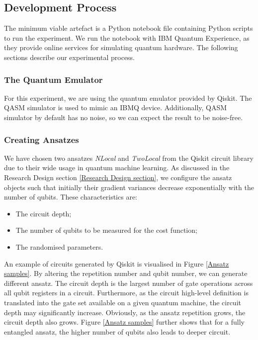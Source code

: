 \subsection{Development Process} \label{Development Process section}
The minimum viable artefact is a Python notebook file containing Python scripts to run the experiment.
We run the notebook with IBM Quantum Experience, as they provide online services for simulating quantum hardware.
The following sections describe our experimental process.

\subsubsection{The Quantum Emulator}
For this experiment, we are using the quantum emulator provided by Qiskit.
The QASM simulator is used to mimic an IBMQ device.
Additionally, QASM simulator by default has no noise, so we can expect the result to be noise-free.

\subsubsection{Creating Ansatzes}
We have chosen two ansatzes \textit{NLocal} and \textit{TwoLocal} from the Qiskit circuit library due to their wide usage in quantum machine learning.
As discussed in the Research Design section \ref{Research Design section}, we configure the ansatz objects such that initially their gradient variances decrease exponentially with the number of qubits.
These characteristics are:
\begin{itemize}
    \item The circuit depth;
    \item The number of qubits to be measured for the cost function;
    \item The randomised parameters.
\end{itemize}

An example of circuits generated by Qiskit is visualised in Figure \ref{Ansatz samples}.
By altering the repetition number and qubit number, we can generate different ansatz.
The circuit depth is the largest number of gate operations across all qubit registers in a circuit. 
Furthermore, as the circuit high-level definition is translated into the gate set available on a given quantum machine, the circuit depth may significantly increase.
Obviously, as the ansatz repetition grows, the circuit depth also grows.
Figure \ref{Ansatz samples} further shows that for a fully entangled ansatz, the higher number of qubits also leads to deeper circuit.

